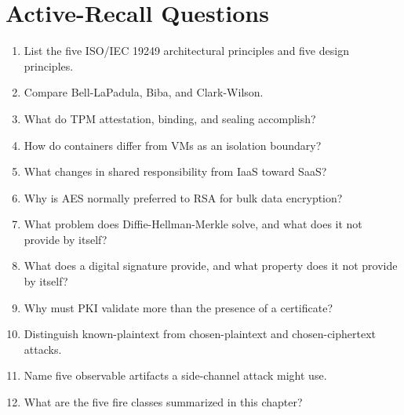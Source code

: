 \documentclass[10pt,letterpaper]{article}
\begin{document}
\section{\color{navy}Active-Recall Questions}
\begin{enumerate}
\item List the five ISO/IEC 19249 architectural principles and five design principles.
\item Compare Bell-LaPadula, Biba, and Clark-Wilson.
\item What do TPM attestation, binding, and sealing accomplish?
\item How do containers differ from VMs as an isolation boundary?
\item What changes in shared responsibility from IaaS toward SaaS?
\item Why is AES normally preferred to RSA for bulk data encryption?
\item What problem does Diffie-Hellman-Merkle solve, and what does it not provide by itself?
\item What does a digital signature provide, and what property does it not provide by itself?
\item Why must PKI validate more than the presence of a certificate?
\item Distinguish known-plaintext from chosen-plaintext and chosen-ciphertext attacks.
\item Name five observable artifacts a side-channel attack might use.
\item What are the five fire classes summarized in this chapter?
\end{enumerate}
\end{document}

